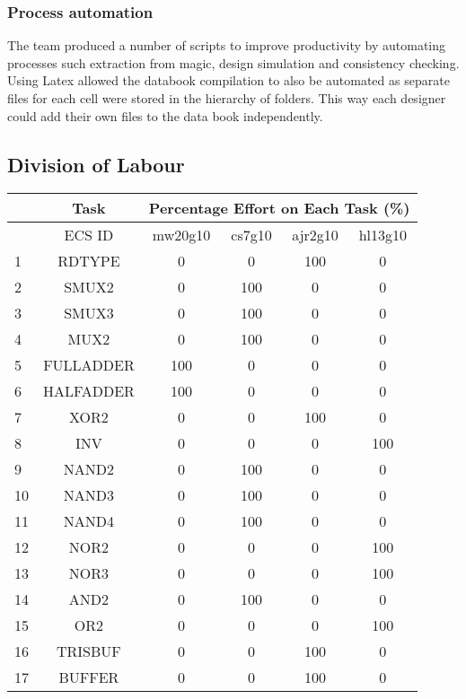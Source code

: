 \subsubsection{Process automation}
The team produced a number of scripts to improve productivity by automating processes such extraction from magic, design simulation and consistency checking.
Using Latex allowed the databook compilation to also be automated as separate files for each cell were stored in the hierarchy of folders.   
This way each designer could add their own files to the data book independently.



\clearpage
\subsection{Division of Labour}
\begin{table}[htb!]
\begin{tabular}{|p{1cm}|c|c|c|c|c|}\hline
&Task & \multicolumn{4}{|c|}{Percentage Effort on Each Task (\%)} \\ \hline
& ECS ID 						& mw20g10 & cs7g10 & ajr2g10 & hl13g10 \\ \hline
1&RDTYPE						&	0	&	0	&	100	&	0	\\ \hline
2&SMUX2							&	0	&	100	&	0	&	0	\\ \hline
3&SMUX3							&	0	&	100	&	0	&	0	\\ \hline
4&MUX2							&	0	&	100	&	0	&	0	\\ \hline
5&FULLADDER						&	100	&	0	&	0	&	0	\\ \hline
6&HALFADDER						&	100	&	0	&	0	&	0	\\ \hline
7&XOR2							&	0	&	0	&	100	&	0	\\ \hline
8&INV							&	0	&	0	&	0	&	100	\\ \hline
9&NAND2							&	0	&	100	&	0	&	0	\\ \hline
10&NAND3						&	0	&	100	&	0	&	0	\\ \hline
11&NAND4						&	0	&	100	&	0	&	0	\\ \hline
12&NOR2							&	0	&	0	&	0	&	100	\\ \hline
13&NOR3							&	0	&	0	&	0	&	100	\\ \hline
14&AND2							&	0	&	100	&	0	&	0	\\ \hline
15&OR2							&	0	&	0	&	0	&	100	\\ \hline
16&TRISBUF						&	0	&	0	&	100	&	0	\\ \hline
17&BUFFER						&	0	&	0	&	100	&	0	\\ \hline

\end{tabular}
\end{table}
